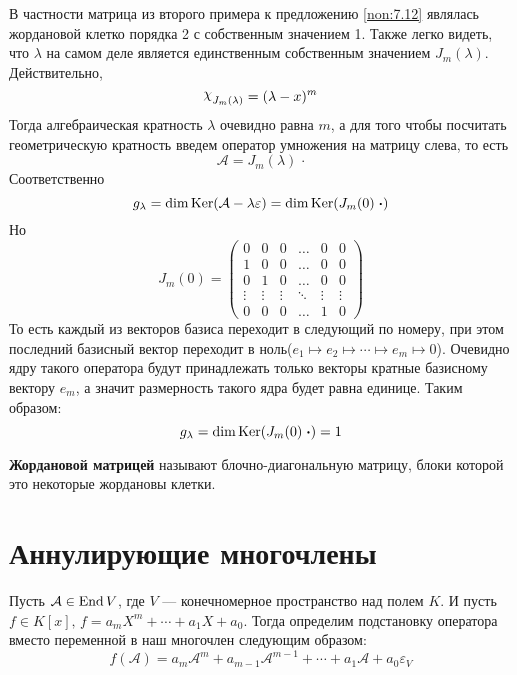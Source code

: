 \documentclass[../main.tex]{subfiles}
\begin{document}
В частности матрица из второго примера к предложению \ref{non:7.12} являлась жордановой клетко порядка 2 с собственным значением 1. Также легко видеть, что $\lambda$ на самом деле является единственным собственным значением $J_m(\lambda)$. Действительно,
\begin{equation*}
  \rchi_{J_m(\lambda)} = (\lambda - x)^m
\end{equation*}
Тогда алгебраическая кратность $\lambda$ очевидно равна $m$, а для того чтобы посчитать геометрическую кратность введем оператор умножения на матрицу слева, то есть
\begin{equation*}
  \mathcal{A} = J_m(\lambda) \;\bm{\cdot}
\end{equation*}
Соответственно
\begin{equation*}
  g_{\lambda}
  =
  \dim \operatorname{Ker}(\mathcal{A} - \lambda \varepsilon)
  =
  \dim \operatorname{Ker}(J_m(0) \; \bm{\cdot})
\end{equation*}
Но
\begin{equation*}
  J_m(0) =
    \begin{pmatrix}
      0 & 0 & 0 & \hdots & 0 & 0 \\
      1 & 0 & 0 & \hdots & 0 & 0 \\
      0 & 1 & 0 & \hdots & 0 & 0 \\
      \vdots & \vdots & \vdots & \ddots & \vdots & \vdots \\
      0 & 0 & 0 & \hdots & 1 & 0
    \end{pmatrix}
\end{equation*}
То есть каждый из векторов базиса переходит в следующий по номеру, при этом последний базисный вектор переходит в ноль($e_1 \mapsto e_2 \mapsto \dotsb \mapsto e_{m} \mapsto 0$). Очевидно ядру такого оператора будут принадлежать только векторы кратные базисному вектору $e_m$, а значит размерность такого ядра будет равна единице. Таким образом:
\begin{equation*}
  g_{\lambda} = \dim \operatorname{Ker}(J_m(0) \; \bm{\cdot}) = 1
\end{equation*}

\begin{definition}
  \textbf{Жордановой матрицей} называют блочно-диагональную матрицу, блоки которой это некоторые жордановы клетки.
\end{definition}

\section{Аннулирующие многочлены}
Пусть $\mathcal{A} \in \operatorname{End} V$, где $V$ --- конечномерное пространство над полем $K$. И пусть $f \in K[x],\, f = a_m X^m + \dotsb + a_1 X + a_0$. Тогда определим подстановку оператора вместо переменной в наш многочлен следующим образом:
\begin{equation*}
  f(\mathcal{A})
  =
  a_m \mathcal{A}^{m}
  +
  a_{m - 1} \mathcal{A}^{m - 1}
  +
  \dotsb
  +
  a_1 \mathcal{A}
  +
  a_0 \varepsilon_V
\end{equation*}
\end{document}
